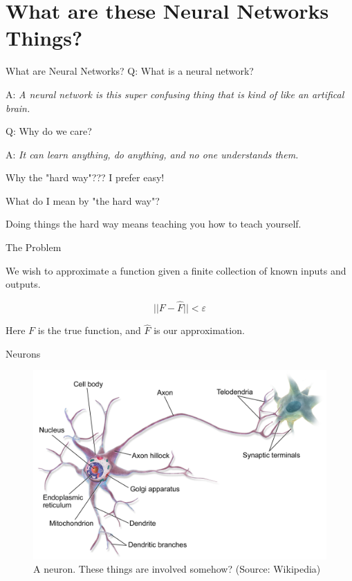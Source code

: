 \documentclass[11pt]{beamer}
\let\epsilon=\varepsilon
\begin{document}
\section{What are these Neural Networks Things?}

\begin{frame}{What are Neural Networks?}
Q: What is a neural network?

\bigskip 

A: \emph{A neural network is this super confusing thing that is kind of like an artifical brain.}

\bigskip 

Q: Why do we care?

\bigskip 

A: \emph{It can learn anything, do anything, and no one understands them.}
\end{frame}

\begin{frame}{Why the "hard way"??? I prefer easy!}

What do I mean by "the hard way"?

Doing things the hard way means teaching you how to teach yourself.

\end{frame}

\begin{frame}{The Problem}

We wish to approximate a function given a finite collection of known inputs and outputs.

\bigskip

$$||F - \widehat{F}|| < \epsilon$$

\bigskip

Here $F$ is the true function, and $\widehat{F}$ is our approximation.
\end{frame}

\begin{frame}{Neurons}

\begin{center}
\begin{figure}
\includegraphics[scale=0.1]{Blausen_0657_MultipolarNeuron}
\caption{A neuron. These things are involved somehow? (Source: Wikipedia)}
\end{figure}
\end{center}
	
\end{frame}
\end{document}
